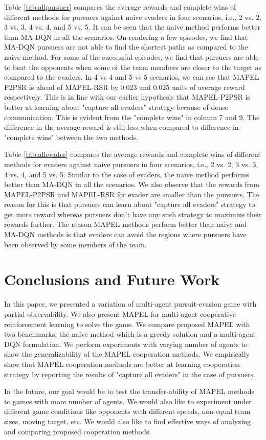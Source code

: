 \documentclass[conference]{IEEEtran}
\begin{document}
Table \ref{tab:allpursuer} compares the average rewards and complete wins of different methods for pursuers against naive evaders in four scenarios, i.e., 2 vs. 2, 3 vs. 3, 4 vs. 4, and 5 vs. 5. It can be seen that the naive method performs better than MA-DQN in all the scenarios. On rendering a few episodes, we find that MA-DQN pursuers are not able to find the shortest paths as compared to the naive method. For some of the successful episodes, we find that pursuers are able to beat the opponents when some of the team members are closer to the target as compared to the evaders. In 4 vs 4 and 5 vs 5 scenarios, we can see that MAPEL-P2PSR is ahead of MAPEL-RSR by 0.023 and 0.025 units of average reward respectively. This is in line with our earlier hypothesis that MAPEL-P2PSR is better at learning about "capture all evaders" strategy because of dense communication. This is evident from the "complete wins" in column 7 and 9. The difference in the average reward is still less when compared to difference in "complete wins" between the two methods.

Table \ref{tab:allevader} compares the average rewards and complete wins of different methods for evaders against naive pursuers in four scenarios, i.e., 2 vs. 2, 3 vs. 3, 4 vs. 4, and 5 vs. 5. Similar to the case of evaders, the naive method performs better than MA-DQN in all the scenarios. We also observe that the rewards from MAPEL-P2PSR and MAPEL-RSR for evader are smaller than the pursuers. The reason for this is that pursuers can learn about "capture all evaders" strategy to get more reward whereas pursuers don't have any such strategy to maximize their rewards further. The reason MAPEL methods perform better than naive and MA-DQN methods is that evaders can avoid the regions where pursuers have been observed by some members of the team.

\section{Conclusions and Future Work}
In this paper, we presented a variation of multi-agent pursuit-evasion game with partial observability. We also present MAPEL for multi-agent cooperative reinforcement learning to solve the game. We compare proposed MAPEL with two benchmarks; the naive method which is a greedy solution and a multi-agent DQN formulation. We perform experiments with varying number of agents to show the generalizability of the MAPEL cooperation methods. We empirically show that MAPEL cooperation methods are better at learning cooperation strategy by reporting the results of "capture all evaders" in the case of pursuers.

In the future, our goal would be to test the transfer-ability of MAPEL methods to games with more number of agents. We would also like to experiment under different game conditions like opponents with different speeds, non-equal team sizes, moving target, etc. We would also like to find effective ways of analyzing and comparing proposed cooperation methods.

\vspace{2mm}

\end{document}
